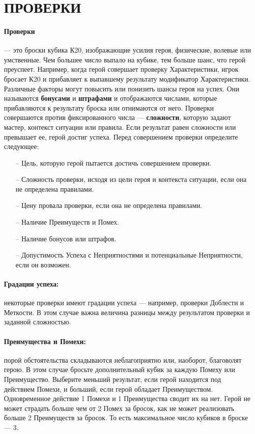 \section{ПРОВЕРКИ}
\paragraph{Проверки} — это броски кубика К20, изображающие усилия героя, физические, волевые или умственные. Чем большее число выпало на кубике, тем больше шанс, что герой преуспеет. Например, когда герой совершает проверку Характеристики, игрок бросает К20 и прибавляет к выпавшему результату модификатор Характеристики. Различные факторы могут повысить или понизить шансы героя на успех. Они называются \textbf{бонусами} и \textbf{штрафами} и отображаются числами, которые прибавляются к результату броска или отнимаются от него.
\newline Проверки совершаются против фиксированного числа — \textbf{сложности}, которую задают мастер, контекст ситуации или правила. Если результат равен сложности или превышает ее, герой достиг успеха.
\newline Перед совершением проверки определите следующее:
\begin{itemize}
\item[--]Цель, которую герой пытается достичь совершением проверки.
\item[--]Сложность проверки, исходя из цели героя и контекста
ситуации, если она не определена правилами.
\item[--]Цену провала проверки, если она не определена правилами.
\item[--]Наличие Преимуществ и Помех.
\item[--]Наличие бонусов или штрафов.
\item[--]Допустимость Успеха с Неприятностями и потенциальные Неприятности, если он возможен.
\end{itemize}
\paragraph{Градации успеха:} некоторые проверки имеют градации успеха — например, проверки Доблести и Меткости. В этом случае важна величина разницы между результатом проверки и заданной сложностью.
\paragraph{Преимущества и Помехи:} порой обстоятельства складываются неблагоприятно или, наоборот, благоволят герою. В этом случае бросьте дополнительный кубик за каждую Помеху или Преимущество. Выберите меньший результат, если герой находится под действием Помехи, и больший, если герой обладает Преимуществом. Одновременное действие 1 Помехи и 1 Преимущества сводит их на нет. Герой не может страдать больше чем от 2 Помех за бросок, как не может реализовать больше 2 Преимуществ за бросок. То есть максимальное число кубиков в броске — 3.
